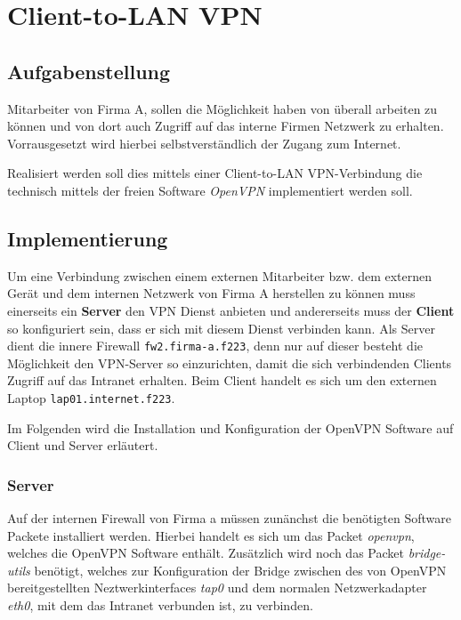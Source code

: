 \chapter{Client-to-LAN VPN}

\section{Aufgabenstellung}

Mitarbeiter von Firma A, sollen die Möglichkeit haben von überall arbeiten zu können und von dort auch Zugriff auf das interne Firmen Netzwerk zu erhalten.
Vorrausgesetzt wird hierbei selbstverständlich der Zugang zum Internet.

Realisiert werden soll dies mittels einer Client-to-LAN VPN-Verbindung die technisch mittels der freien Software \emph{OpenVPN} implementiert werden soll.

\section{Implementierung}

Um eine Verbindung zwischen einem externen Mitarbeiter bzw. dem externen Gerät und dem internen Netzwerk von Firma A herstellen zu können muss einerseits ein \textbf{Server} den VPN Dienst anbieten und andererseits muss der \textbf{Client} so konfiguriert sein, dass er sich mit diesem Dienst verbinden kann.
Als Server dient die innere Firewall \texttt{fw2.firma-a.f223}, denn nur auf dieser besteht die Möglichkeit den VPN-Server so einzurichten, damit die sich verbindenden Clients Zugriff auf das Intranet erhalten.
Beim Client handelt es sich um den externen Laptop \texttt{lap01.internet.f223}.

Im Folgenden wird die Installation und Konfiguration der OpenVPN Software auf Client und Server erläutert.


\subsection{Server}

Auf der internen Firewall von Firma a müssen zunänchst die benötigten Software Packete installiert werden. Hierbei handelt es sich um das Packet \emph{openvpn}, welches die OpenVPN Software enthält. Zusätzlich wird noch das Packet \emph{bridge-utils} benötigt, welches zur Konfiguration der Bridge zwischen des von OpenVPN bereitgestellten Neztwerkinterfaces \emph{tap0} und dem normalen Netzwerkadapter \emph{eth0}, mit dem das Intranet verbunden ist, zu verbinden.

